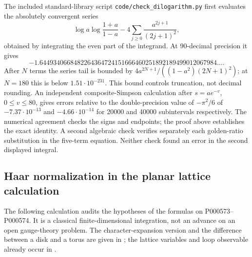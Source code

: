 \begin{remark}\leavevmode\par\noindent\oursComputed\quad
The included standard-library script \texttt{code/check\_dilogarithm.py} first evaluates the absolutely convergent series
\[
 \log a\log\frac{1+a}{1-a}
       -4\sum_{j\ge0}\frac{a^{2j+1}}{(2j+1)^2},
\]
obtained by integrating the even part of the integrand. At 90-decimal precision it gives
\[
 -1.6449340668482264364724151666460251892189499012067984\ldots.
\]
After \(N\) terms the series tail is bounded by
\(4a^{2N+1}/((1-a^2)(2N+1)^2)\); at \(N=180\) this is below \(1.51\cdot10^{-231}\). This bound controls truncation, not decimal rounding.
An independent composite-Simpson calculation after \(s=a e^{-v}\), \(0\le v\le80\), gives errors relative to the double-precision value of \(-\pi^2/6\) of \(-7.37\cdot10^{-13}\) and \(-4.66\cdot10^{-14}\) for 20000 and 40000 subintervals respectively. The numerical agreement checks the signs and endpoints; the proof above establishes the exact identity. A second algebraic check verifies separately each golden-ratio substitution in the five-term equation. Neither check found an error in the second displayed integral.
\end{remark}

\subsection{Haar normalization in the planar lattice calculation}
The following calculation audits the hypotheses of the formulas on P000573--P000574. It is a classical finite-dimensional integration, not an advance on an open gauge-theory problem. The character-expansion version and the difference between a disk and a torus are given in \citet[Appendix A]{hirasawa2020complex}; the lattice variables and loop observable already occur in \citet[\S\S II--III]{wilson1974confinement}.

